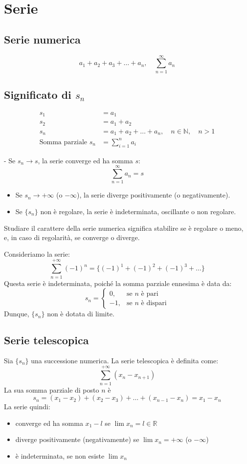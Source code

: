 \documentclass{article}
\begin{document}
\section*{Serie}

\subsection*{Serie numerica}
\[
a_1 + a_2 + a_3 + \dots + a_n, \quad \sum_{n=1}^{\infty} a_n
\]

\subsection*{Significato di $s_n$}
\begin{align}
    s_1 &= a_1 \\
    s_2 &= a_1 + a_2 \\
    s_n &= a_1 + a_2 + \dots + a_n, \quad n \in \mathbb{N}, \quad n > 1 \\
    \text{Somma parziale } s_n &= \sum_{i=1}^n a_i
\end{align}

- Se $s_n \to s$, la serie converge ed ha somma $s$:
\[
\sum_{n=1}^{\infty} a_n = s
\]

\begin{itemize}
    \item Se $s_n \to +\infty$ (o $-\infty$), la serie diverge positivamente (o negativamente).
    \item Se $\{s_n\}$ non è regolare, la serie è indeterminata, oscillante o non regolare.
\end{itemize}

Studiare il carattere della serie numerica significa stabilire se è regolare o meno, e, in caso di regolarità, se converge o diverge.

Consideriamo la serie:
\[
\sum_{n=1}^{+\infty} (-1)^n = \{ (-1)^1 + (-1)^2 + (-1)^3 + \dots \}
\]
Questa serie è indeterminata, poiché la somma parziale ennesima è data da:
\[
s_n = 
\begin{cases}  
0, & \text{se } n \text{ è pari} \\ 
-1, & \text{se } n \text{ è dispari}
\end{cases}
\]
Dunque, $\{s_n\}$ non è dotata di limite.

\subsection*{Serie telescopica}
Sia $\{s_n\}$ una successione numerica. La serie telescopica è definita come:
\[
\sum_{n=1}^{+\infty} (x_n - x_{n+1})
\]
La sua somma parziale di posto $n$ è 
\[
s_n = (x_1 - x_2) + (x_2 - x_3) + \dots + (x_{n-1} - x_n) = x_1 - x_n
\]
La serie quindi:
\begin{itemize} 
    \item converge ed ha somma $x_1 - l$ se $\lim x_n = l \in \mathbb{R}$
    \item diverge positivamente (negativamente) se $\lim x_n = +\infty$ (o $-\infty$)
    \item è indeterminata, se non esiste $\lim x_n$
\end{itemize}
\end{document}
